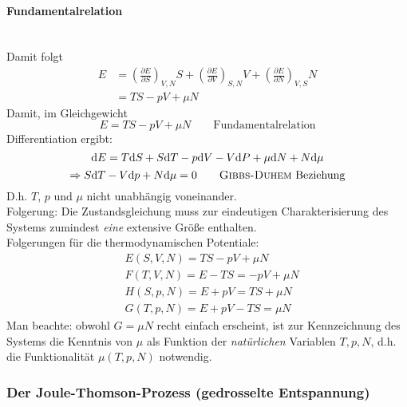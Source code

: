 \paragraph{Fundamentalrelation}\mbox{}\\
Damit folgt
\begin{equation}
    \begin{split}
        E &= \left( \frac{\partial E}{\partial S} \right)_{V, N} S + \left( \frac{\partial E}{\partial V} \right)_{S, N} V + \left( \frac{\partial E}{\partial N} \right)_{V, S} N \\
        &= T S - p V + \mu N
    \end{split}
\end{equation}
Damit, im Gleichgewicht
\begin{equation}
    E = T S - p V + \mu N \qquad \text{Fundamentalrelation}
\end{equation}
Differentiation ergibt:
\begin{equation}
    \mathrm{d} E = T \mathrm{d} S + S \mathrm{d} T - p \mathrm{d} V - V \mathrm{d} P + \mu \mathrm{d} N + N \mathrm{d} \mu
\end{equation}
\begin{equation}
    \Rightarrow S \mathrm{d} T - V \mathrm{d} p + N \mathrm{d} \mu = 0 \qquad \text{\textsc{Gibbs-Duhem} Beziehung}
\end{equation}
D.h. $T$, $p$ und $\mu$ nicht unabhängig voneinander. \\
Folgerung: Die Zustandsgleichung muss zur eindeutigen Charakterisierung des Systems zumindest \emph{eine} extensive Größe enthalten. \\
Folgerungen für die thermodynamischen Potentiale:
\begin{equation}
    \begin{split}
        & E(S, V, N) = T S - p V + \mu N \\
        & F(T, V, N) = E - TS = - pV + \mu N \\
        & H(S, p, N) = E + p V = T S + \mu N \\
        & G(T, p, N) = E + p V - T S = \mu N
    \end{split}
\end{equation}
Man beachte: obwohl $G=\mu N$ recht einfach erscheint, ist zur Kennzeichnung des Systems die Kenntnis von $\mu$ als Funktion der \emph{natürlichen}
Variablen $T, p, N$, d.h. die Funktionalität $\mu(T, p, N)$ notwendig.

\subsubsection{Der Joule-Thomson-Prozess (gedrosselte Entspannung)}

